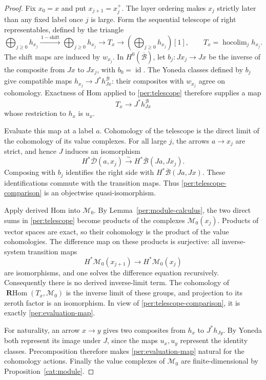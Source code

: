\documentclass[11pt]{article}
\theoremstyle{definition}
\theoremstyle{remark}
\numberwithin{equation}{section}
\begin{document}
\begin{proof}
Fix $x_0=x$ and put $x_{j+1}=x_j^+$.  The layer ordering makes $x_j$
strictly later than any fixed label once $j$ is large.  Form the
sequential telescope of right representables, defined by the triangle
\begin{equation}
 \bigoplus_{j\ge0}h_{x_j}
  \xrightarrow{\,1-\mathrm{shift}\,}
 \bigoplus_{j\ge0}h_{x_j}
  \longrightarrow T_x\longrightarrow
 \left(\bigoplus_{j\ge0}h_{x_j}\right)[1],
 \qquad
 T_x=\operatorname{hocolim}_j h_{x_j}.
 \label{per:telescope}
\end{equation}
The shift maps are induced by $w_{x_j}$.  In
$H^0(\overline{\mathcal B})$, let
$b_j:Jx_j\to Jx$ be the inverse of the composite from $Jx$ to $Jx_j$,
with $b_0=\operatorname{id}$.  The Yoneda classes defined by $b_j$ give compatible
maps
$h_{x_j}\to J^*h_{Jx}^{\overline{\mathcal B}}$: their composites with
$w_{x_j}$ agree on cohomology.  Exactness of Hom applied to
\eqref{per:telescope} therefore supplies a map
\begin{equation}
 T_x\longrightarrow J^*h_{Jx}^{\overline{\mathcal B}}
 \label{per:telescope-comparison}
\end{equation}
whose restriction to $h_x$ is $u_x$.

Evaluate this map at a label $a$.  Cohomology of the telescope is the
direct limit of the cohomology of its value complexes.  For all large
$j$, the arrows $a\to x_j$ are strict, and hence $J$ induces an
isomorphism
\[
 H^*\overline{\mathcal D}(a,x_j)
    \xrightarrow{\ \sim\ }
 H^*\overline{\mathcal B}(Ja,Jx_j).
\]
Composing with $b_j$ identifies the right side with
$H^*\overline{\mathcal B}(Ja,Jx)$.  These identifications commute with
the transition maps.  Thus \eqref{per:telescope-comparison} is an
objectwise quasi-isomorphism.

Apply derived Hom into $\mathcal M_0$.  By
Lemma~\ref{per:module-calculus}, the two direct sums in
\eqref{per:telescope} become products of the complexes
$\mathcal M_0(x_j)$.  Products of vector spaces are exact, so their
cohomology is the product of the value cohomologies.  The difference
map on these products is surjective: all inverse-system transition
maps
\[
 H^*\mathcal M_0(x_{j+1})\longrightarrow H^*\mathcal M_0(x_j)
\]
are isomorphisms, and one solves the difference equation recursively.
Consequently there is no derived inverse-limit term.  The cohomology
of $\operatorname{\mathbf R Hom}(T_x,\mathcal M_0)$ is the inverse limit of these groups,
and projection to its zeroth factor is an isomorphism.  In view of
\eqref{per:telescope-comparison}, it is exactly
\eqref{per:evaluation-map}.

For naturality, an arrow $x\to y$ gives two composites from $h_x$ to
$J^*h_{Jy}$.  By Yoneda both represent its image under $J$, since the
maps $u_x,u_y$ represent the identity classes.  Precomposition
therefore makes \eqref{per:evaluation-map} natural for the
cohomology actions.  Finally the value complexes of $\mathcal M_0$
are finite-dimensional by Proposition~\ref{cat:module}.
\end{proof}
\end{document}
